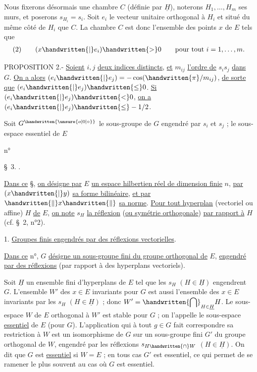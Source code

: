 Nous fixerons désormais une chambre $C$ (définie par $\underline{H}$), noterons $H_1,\ldots,H_m$ ses murs, et poserons $s_{H_i}=s_i$. Soit $e_i$ le vecteur unitaire orthogonal à $H_i$ et situé du même côté de $H_i$ que $C$. La chambre $C$ est donc l'ensemble des points $x$ de $E$ tels que
\[
\begin{array}{l@{\qquad}l}(2)&(x\handwritten{|}e_i)\handwritten{>}0\qquad\text{pour tout }i=1,\ldots,m.\end{array}
\]

PROPOSITION 2.- \uline{Soient} $i,j$ \uline{deux indices distincts}, \uline{et} $m_{ij}$ \uline{l'ordre de} $s_i s_j$ \uline{dans} $G$. \uline{On a alors} $(e_i\handwritten{|}e_j)=-\cos(\handwritten{\pi}/m_{ij})$, \uline{de sorte que} $(e_i\handwritten{|}e_j)\handwritten{\leq}0$. \uline{Si} $(e_i\handwritten{|}e_j)\handwritten{<}0$, \uline{on a} $(e_i\handwritten{|}e_j)\handwritten{\leq}-1/2$.

Soit $G^{\handwritten{\unsure{o|0|\circ}}}$ le sous-groupe de $G$ engendré par $s_i$ et $s_j$ ; le sous-espace essentiel de $E$
\begin{flushright}n° \end{flushright}
\begin{center}\S\ 3. .\end{center}

\uline{Dans ce} \S, \uline{on désigne par} $E$ \uline{un espace hilbertien réel de dimension finie} $n$, \uline{par} $(x\handwritten{|}y)$ \uline{sa forme bilinéaire}, \uline{et par} $\handwritten{\lVert}x\handwritten{\rVert}$ \uline{sa norme}. \uline{Pour tout hyperplan} (vectoriel ou affine) $H$ \uline{de} $E$, \uline{on note} $s_H$ \uline{la réflexion} (\uline{ou symétrie orthogonale}) \uline{par rapport à} $H$ (cf. \S\ 2, n°2).

1. \uline{Groupes finis engendrés par des réflexions vectorielles}.

\uline{Dans ce} n°, $G$ \uline{désigne un sous-groupe fini du groupe orthogonal de} $E$, \uline{engendré par des réflexions} (par rapport à des hyperplans vectoriels).

Soit $\underline{H}$ un ensemble fini d'hyperplans de $E$ tel que les $s_H$ $(H\in\underline{H})$ engendrent $G$. L'ensemble $W'$ des $x\in E$ invariants pour $G$ est aussi l'ensemble des $x\in E$ invariants par les $s_H$ $(H\in\underline{H})$ ; donc $\displaystyle W'=\handwritten{\bigcap}_{H\in\underline{H}}H$. Le sous-espace $W$ de $E$ orthogonal à $W'$ est stable pour $G$ ; on l'appelle le sous-espace \uline{essentiel} de $E$ (pour $G$). L'application qui à tout $g\in G$ fait correspondre sa restriction à $W$ est un isomorphisme de $G$ sur un sous-groupe fini $G'$ du groupe orthogonal de $W$, engendré par les réflexions $s_{H\handwritten{\cap}W}$ $(H\in\underline{H})$. On dit que $G$ est \uline{essentiel} si $W=E$ ; en tous cas $G'$ est essentiel, ce qui permet de se ramener le plus souvent au cas où $G$ est essentiel.

